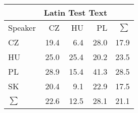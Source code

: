 \begin{tabular}{l|rrr|r}
\hline
 & \multicolumn{3}{c}{Latin Test Text} & \\
\hline
 Speaker   &   CZ &   HU &   PL &   $\sum$ \\
\hline
 CZ        & 19.4 &  6.4 & 28.0 &     17.9 \\
 HU        & 25.0 & 25.4 & 20.2 &     23.5 \\
 PL        & 28.9 & 15.4 & 41.3 &     28.5 \\
 SK        & 20.4 &  9.1 & 22.9 &     17.5 \\
\hline
 $\sum$   & 22.6 & 12.5 & 28.1 &     21.1 \\
\hline
\end{tabular}